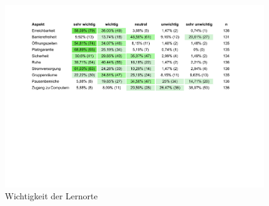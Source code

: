 \documentclass[11pt, a4paper]{article}
\begin{document}
\newpage
\begin{figure}[htbp]
	\vspace*{6.8cm}
	\hspace*{-2.35cm}
	\includegraphics[scale = 0.79, trim=0.5cm 11cm 0.5cm 11cm]{Tabellen.pdf}
	\caption{Wichtigkeit der Lernorte}
\end{figure}
\newpage
\end{document}
